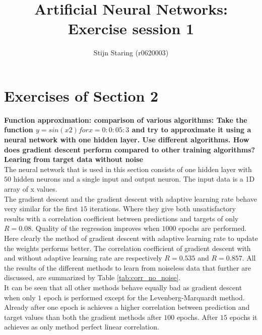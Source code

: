 \documentclass[a4paper,10pt]{article}
\title{Artificial Neural Networks: Exercise session 1}
\author{Stijn Staring (r0620003)}
\newcommand{\RemoveMe}[1]{{\color{purple}#1}}
\begin{document}
\selectfont{}

\maketitle


\section{Exercises of Section 2}
\textbf{Function approximation: comparison of various algorithms:
	Take the function $y = sin(x2) for x = 0 : 0:05 : 3$ and try to approximate it using a neural network with one hidden
	layer. Use different algorithms. How does gradient descent perform compared to other training algorithms?}\\

\textbf{Learing from target data without noise}\\
The neural network that is used in this section consists of one hidden layer with $ 50 $ hidden neurons and a single input and output neuron. The input data is a 1D array of x values. \\

The gradient descent and the gradient descent with adaptive learning rate behave very similar for the first $ 15 $ iterations. Where they give both unsatisfactory results with a correlation coefficient between predictions and targets of only $ R = 0.08 $. Quality of the regression improves when $ 1000 $ epochs are performed. Here clearly the method of gradient descent with adaptive learning rate to update the weights performs better. The correlation coefficient of gradient descent with and without adaptive learning rate are respectively $ R = 0.535 $ and $ R = 0.857 $. All the results of the different methods to learn from noiseless data that further are discussed, are summarized by Table \ref{tab:corr_no_noise}.\\

It can be seen that all other methods behave equally bad as gradient descent when only $ 1 $ epoch is performed except for the Levenberg-Marquardt method. Already after one epoch is achieves a higher correlation between prediction and target values than both the gradient methods after $ 100 $ epochs. After $ 15 $ epochs it achieves as only method perfect linear correlation.\\ 
\end{document}
